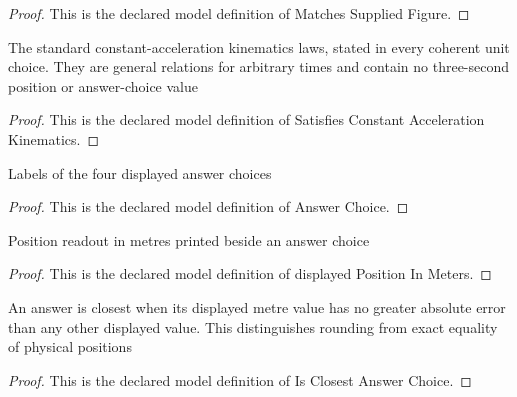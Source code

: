 \begin{proof}
  This is the declared model definition of Matches Supplied Figure.
\end{proof}
\begin{definition}
  \label{def:physics:phyx-mini-0795:phyxminiproblems-problemphyxmini0795-satisfiesconstantaccelerationkinematics}
  The standard constant-acceleration kinematics laws, stated in every coherent unit choice. They are general relations for arbitrary times and contain no three-second position or answer-choice value
\end{definition}
\begin{proof}
  This is the declared model definition of Satisfies Constant Acceleration Kinematics.
\end{proof}
\begin{definition}
  \label{def:physics:phyx-mini-0795:phyxminiproblems-problemphyxmini0795-answerchoice}
  Labels of the four displayed answer choices
\end{definition}
\begin{proof}
  This is the declared model definition of Answer Choice.
\end{proof}
\begin{definition}
  \label{def:physics:phyx-mini-0795:phyxminiproblems-problemphyxmini0795-answerchoice-displayedpositioninmeters}
  Position readout in metres printed beside an answer choice
\end{definition}
\begin{proof}
  This is the declared model definition of displayed Position In Meters.
\end{proof}
\begin{definition}
  \label{def:physics:phyx-mini-0795:phyxminiproblems-problemphyxmini0795-isclosestanswerchoice}
  An answer is closest when its displayed metre value has no greater absolute error than any other displayed value. This distinguishes rounding from exact equality of physical positions
\end{definition}
\begin{proof}
  This is the declared model definition of Is Closest Answer Choice.
\end{proof}
